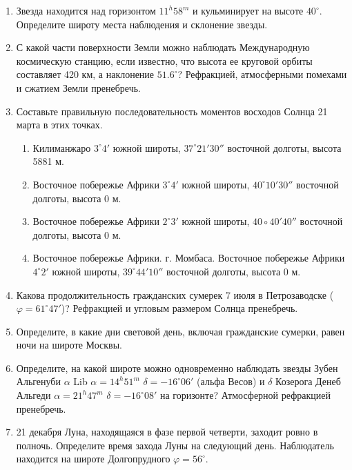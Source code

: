 \begin{enumerate}
    \item Звезда находится над горизонтом $11^h58^m$ и кульминирует на высоте $40^\circ$. Определите широту места наблюдения и склонение звезды.
    \item С какой части поверхности Земли можно наблюдать Международную космическую станцию, если известно, что высота ее круговой орбиты составляет 420 км, а наклонение $51.6^\circ$? Рефракцией, атмосферными помехами и сжатием Земли пренебречь.
    \item Составьте правильную последовательность моментов восходов Солнца 21 марта в этих точках.
    \begin{enumerate}[label=\alph*.]
        \item Килиманжаро $3^\circ4'$ южной широты, $37^\circ21'30''$ восточной долготы, высота 5881 м.
        \item Восточное побережье Африки $3^\circ4'$ южной широты, $40^\circ10'30''$ восточной долготы, высота 0 м.
        \item Восточное побережье Африки $2^\circ3'$ южной широты, $40\circ40'40''$ восточной долготы, высота 0 м.
        \item Восточное побережье Африки. г. Момбаса. Восточное побережье Африки $4^\circ2'$ южной широты, $39^\circ44'10''$ восточной долготы, высота 0 м.
    \end{enumerate}
    \item Какова продолжительность гражданских сумерек 7 июля в Петрозаводске ($\varphi = 61^\circ47'$)? Рефракцией и угловым размером Солнца пренебречь.
    \item Определите, в какие дни световой день, включая гражданские сумерки, равен ночи на широте Москвы.
    \item Определите, на какой широте можно одновременно наблюдать звезды Зубен Альгенуби $\alpha$ Lib $\alpha= 14^h51^m$  $\delta=-16^\circ06'$ (альфа Весов) и $\delta$ Козерога Денеб Альгеди $\alpha = 21^h47^m$ $\delta=-16^\circ08'$ на горизонте? Атмосферной рефракцией пренебречь.
    \item 21 декабря Луна, находящаяся в фазе первой четверти, заходит ровно в полночь. Определите время захода Луны на следующий день. Наблюдатель находится на широте Долгопрудного $\varphi = 56^\circ$.
\end{enumerate}
